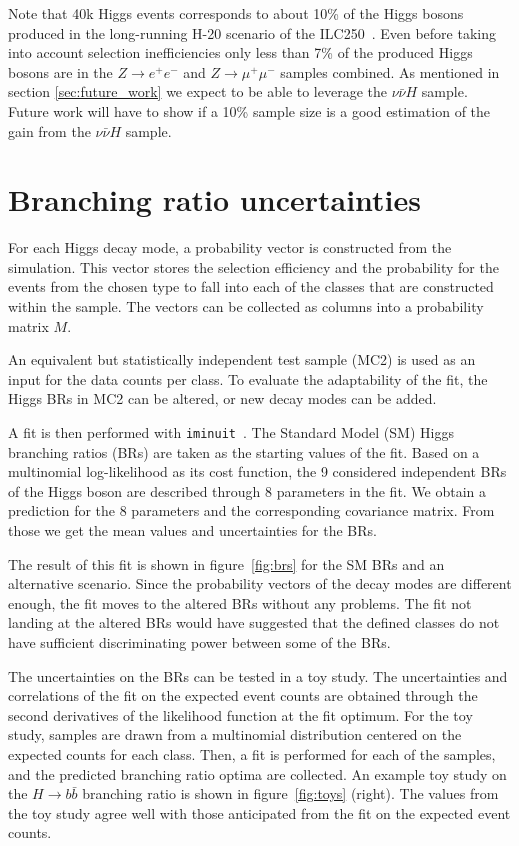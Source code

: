 \documentclass[11pt, hidelinks, a4paper]{scrartcl}
\begin{document}
Note that 40k Higgs events corresponds to about 10\% of the Higgs bosons
produced in the long-running H-20 scenario of the ILC250~\cite{ILC_Scenarios}.
Even before taking into account selection inefficiencies
only less than 7\% of the produced Higgs bosons
are in the $Z \to e^+ e^-$ and $Z \to \mu^+ \mu^-$ samples combined.
As mentioned in section \ref{sec:future_work}
we expect to be able to leverage the $\nu \bar{\nu} H$ sample.
Future work will have to show if a 10\% sample size
is a good estimation of the gain from the $\nu \bar{\nu} H$ sample.

\section{Branching ratio uncertainties}\label{sec:fit}
For each Higgs decay mode, a probability vector is
constructed from the simulation.
This vector stores the selection efficiency and the probability
for the events from the chosen type to fall into each of the classes
that are constructed within the sample.
The vectors can be collected as columns into a probability matrix $M$.

An equivalent but statistically independent test sample (MC2) is used as an input for
the data counts per class.
To evaluate the adaptability of the fit, the Higgs BRs in MC2
can be altered, or new decay modes can be added.

A fit is then performed with \texttt{iminuit}~\cite{Minuit,iminuit}.
The Standard Model (SM) Higgs branching ratios (BRs)
are taken
as the starting values of the fit.
Based on a multinomial log-likelihood as its cost function,
the 9 considered independent BRs of the Higgs boson
are described through 8 parameters in the fit.
We obtain a prediction for the 8 parameters
and the corresponding covariance matrix.
From those we get the mean values and uncertainties for the BRs.

The result of this fit is shown in figure~\ref{fig:brs} for
the SM BRs and an alternative scenario.
Since the probability vectors of the decay modes are different enough,
the fit moves to the altered BRs without any problems.
The fit not landing at the altered BRs
would have suggested that the defined classes
do not have sufficient discriminating power
between some of the BRs.

The uncertainties on the BRs can be tested in a toy study.
The uncertainties and correlations of the fit on the expected event counts
are obtained through the second derivatives of the likelihood function
at the fit optimum.
For the toy study, samples are drawn from a multinomial distribution centered on the
expected counts for each class.
Then, a fit is performed for each of the samples, and the predicted
branching ratio optima are collected.
An example toy study on the $H \to b \bar{b}$ branching ratio is shown in
figure~\ref{fig:toys} (right).
The values from the toy study agree well with those anticipated
from the fit on the expected event counts.
\end{document}
